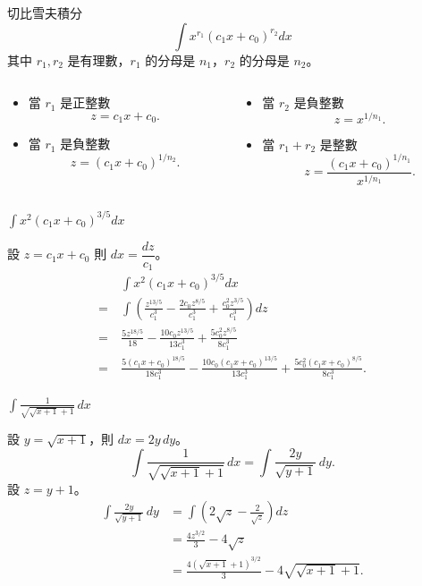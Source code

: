 \documentclass{beamer}
\theoremstyle{remark}
\begin{document}
\begin{CJK}{UTF8}{bsmi}
\begin{frame}{切比雪夫積分}
  \[\int x^{r_1} \left( c_1 x + c_0 \right)^{r_2} dx\]
  其中 $r_1, r_2$ 是有理數，$r_1$ 的分母是 $n_1$，$r_2$ 的分母是 $n_2$。
  \begin{columns}
    \begin{column}[t]{0.5\textwidth}
      \begin{itemize}
	\item 當 $r_1$ 是正整數
	  \[z = c_1 x + c_0.\]
	\item 當 $r_1$ 是負整數
	  \[z = \left( c_1 x + c_0 \right)^{1/n_2}.\]
      \end{itemize}
    \end{column}
    \begin{column}[t]{0.5\textwidth}
      \begin{itemize}
	\item 當 $r_2$ 是負整數
	  \[z = x^{1/n_1}.\]
	\item 當 $r_1 + r_2$ 是整數
	  \[z = \frac{\left( c_1 x + c_0 \right)^{1/n_1}}{x^{1/n_1}}.\]
      \end{itemize}
    \end{column}
  \end{columns}
\end{frame}

\begin{frame}{$\displaystyle \int x^2 \left( c_1 x + c_0 \right)^{3/5} dx$}
  \begin{solution}
    設 $z = c_1 x + c_0$ 則 $dx = \dfrac{dz}{c_1}$。
    \begin{align*}
	 & \int x^2 \left( c_1 x + c_0 \right)^{3/5} dx\\
      =\:& \int \left( \frac{z^{13/5}}{c_1^3} - \frac{2 c_0 z^{8/5}}{c_1^3}
	  + \frac{c_0^2 z^{3/5}}{c_1^3} \right) dz\\
      =\:& \frac{5z^{18/5}}{18} - \frac{10 c_0 z^{13/5}}{13 c_1^3} + \frac{5 c_0^2 z^{8/5}}{8 c_1^3}\\
      =\:& \frac{5 \left( c_1 x + c_0 \right)^{18/5}}{18 c_1^3}
	  - \frac{10 c_0 \left( c_1 x + c_0 \right)^{13/5}}{13 c_1^3}
	  + \frac{5 c_0^2 \left( c_1 x + c_0 \right)^{8/5}}{8 c_1^3}.
    \end{align*}
  \end{solution}
\end{frame}

\begin{frame}{$\displaystyle \int \frac{1}{\sqrt{\sqrt{x+1}+1}}\,dx$}
  \begin{solution}
    設 $y = \sqrt{x+1}$，則 $dx = 2y\,dy$。
    \[\int \frac{1}{\sqrt{\sqrt{x+1}+1}}\,dx = \int \frac{2y}{\sqrt{y+1}}\,dy.\]
    設 $z = y+1$。
    \begin{align*}
      \int \frac{2y}{\sqrt{y+1}}\,dy &= \int \left( 2 \sqrt z - \frac{2}{\sqrt z} \right) dz\\
	&= \frac{4z^{3/2}}{3} - 4 \sqrt z\\
	&= \frac{4 \left( \sqrt{x+1}+1 \right)^{3/2}}{3} - 4 \sqrt{\sqrt{x+1}+1}.
    \end{align*}
  \end{solution}
\end{frame}


\end{CJK}
\end{document}
